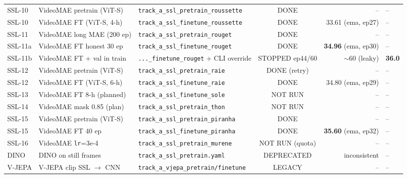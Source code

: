 \begin{table}[ht]
{\begin{tabular}{@{}l l l c r l@{}}
SSL-10 & VideoMAE pretrain (ViT-S)  & \texttt{track\_a\_ssl\_pretrain\_roussette}   & DONE          & --          & --    \\
SSL-10 & VideoMAE FT (ViT-S, 4-h)   & \texttt{track\_a\_ssl\_finetune\_roussette}   & DONE          & 33.61 (ema, ep27) & -- \\
SSL-11 & VideoMAE long MAE (200 ep) & \texttt{track\_a\_ssl\_pretrain\_rouget}      & DONE          & --          & --    \\
SSL-11a& VideoMAE FT honest 30 ep   & \texttt{track\_a\_ssl\_finetune\_rouget}      & DONE          & \textbf{34.96} (ema, ep30) & --    \\
SSL-11b& VideoMAE FT + val in train & \texttt{...\_finetune\_rouget} + CLI override & STOPPED ep44/60 & \(\sim 60\) (leaky) & \textbf{36.0} \\
SSL-12 & VideoMAE pretrain (ViT-S)  & \texttt{track\_a\_ssl\_pretrain\_raie}        & DONE (retry)  & --          & --    \\
SSL-12 & VideoMAE FT (ViT-S, 6-h)   & \texttt{track\_a\_ssl\_finetune\_raie}        & DONE          & 34.80 (ema, ep29) & --    \\
SSL-13 & VideoMAE FT 8-h (planned)  & \texttt{track\_a\_ssl\_finetune\_sole}        & NOT RUN       & --          & --    \\
SSL-14 & VideoMAE mask 0.85 (plan)  & \texttt{track\_a\_ssl\_pretrain\_thon}        & NOT RUN       & --          & --    \\
SSL-15 & VideoMAE pretrain (ViT-S)  & \texttt{track\_a\_ssl\_pretrain\_piranha}     & DONE          & --          & --    \\
SSL-15 & VideoMAE FT 40 ep          & \texttt{track\_a\_ssl\_finetune\_piranha}     & DONE          & \textbf{35.60} (ema, ep32) & --    \\
SSL-16 & VideoMAE \texttt{lr}=3e-4  & \texttt{track\_a\_ssl\_pretrain\_murene}      & NOT RUN (quota) & --        & --    \\
DINO   & DINO on still frames       & \texttt{track\_a\_ssl\_pretrain.yaml}         & DEPRECATED    & inconsistent & --   \\
V-JEPA & V-JEPA clip SSL $\to$ CNN  & \texttt{track\_a\_vjepa\_pretrain/finetune}   & LEGACY        & --          & --    \\
\bottomrule
\end{tabular}%
}
\end{table}

